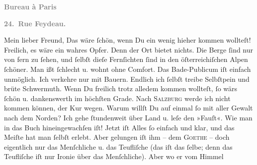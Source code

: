 \begin{ledgroupsized}[t]{13cm}
           \pstart
           \begin{otherlanguage}{french}\textcolor{gray}{\textbf{\textbf{Bureau à Paris}}}\end{otherlanguage}\pend
           \pstart
           \begin{otherlanguage}{french}\textcolor{gray}{\textbf{\textbf{24. Rue Feydeau.}}}\end{otherlanguage}\pend
           \pstart\center{}Mein lieber Freund,\pend\pstart
           Das wäre ſchön, wenn Du ein wenig hieher kommen wollteſt! Freilich, es wäre ein
               wahres Opfer. Denn der Ort
               bietet nichts. Die Berge ſind nur von fern zu ſehen, und ſelbſt dieſe Fernſichten
               ſind in den öſterreichiſchen Alpen ſchöner. Man ißt ſchlecht u. wohnt ohne Comfort. Das
               Bade-Publicum iſt einfach unmöglich. Ich verkehre nur mit Bauern. {\pb}Endlich ich ſelbſt  treibe Selbſtpein und brüte Schwermuth. Wenn Du
               freilich trotz alledem kommen wollteſt, ſo wärs ſchön u. dankenswerth im höchſten
               Grade.\pend
           \pstart
           Nach \textsc{Salzburg} werde ich nicht kommen können, der Kur wegen.\pend
           \pstart
           Warum willſt Du auf einmal ſo mit aller Gewalt nach dem Norden?\pend
           \pstart
           Ich gehe ſtundenweit über Land u. leſe den »Fauſt«. Wie man in das {\pb}Buch hineingewachſen iſt!
               Jetzt iſt Alles ſo einfach und klar, und das Meiſte hat man ſelbſt erlebt. Aber
               gelungen iſt ihm – dem \textsc{Goethe} – doch eigentlich nur das Menſchliche u. das Teufliſche (das iſt das ſelbe;
               denn das Teufliſche iſt nur Ironie über das Menſchliche). Aber wo er vom Himmel

\end{ledgroupsized}
